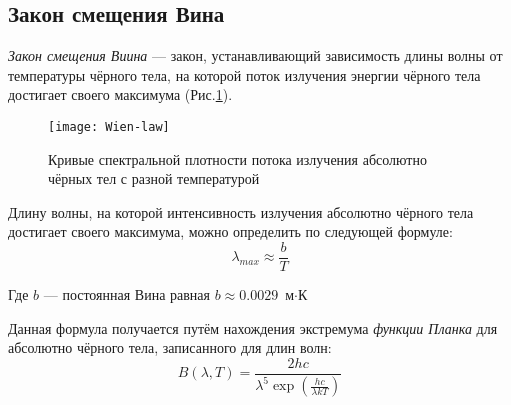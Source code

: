 \subsection{Закон смещения Вина}
\textit{Закон смещения Виина} --- закон, устанавливающий зависимость длины волны от температуры чёрного тела, на которой поток излучения энергии чёрного тела достигает своего максимума (Рис.\ref{pic:wien-law}).

\begin{figure}[h!]
\begin{center}
\texttt{[image: Wien-law]}
\end{center}
\caption{Кривые спектральной плотности потока излучения абсолютно чёрных тел с разной температурой}\label{pic:wien-law}
\end{figure}

Длину волны, на которой интенсивность излучения абсолютно чёрного тела достигает своего максимума, можно определить по следующей формуле:
\begin{equation}
\lambda_{max}\approx\frac{b}{T}
\end{equation}

Где $b$ --- постоянная Вина равная $b\approx0.0029 $ $\text{м} \cdot \text{К}$

Данная формула получается путём нахождения экстремума \textit{функции Планка} для абсолютно чёрного тела, записанного для длин волн:
\begin{equation}
B(\lambda,T)=\frac{2hc}{\lambda^5 \exp \left( \frac{h c}{\lambda k T} \right)
}
\end{equation}
